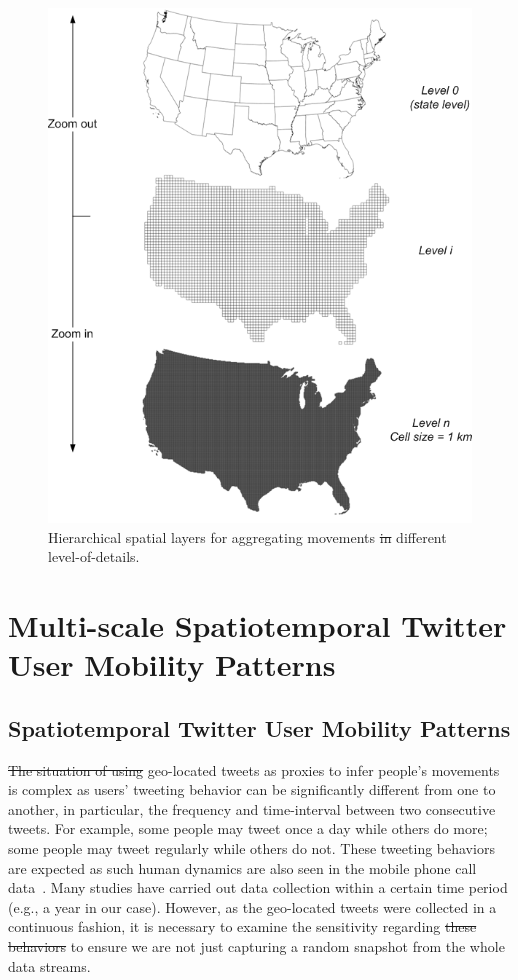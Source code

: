 \documentclass[ijgi,article,accept,moreauthors,pdftex,10pt,a4paper]{mdpi}
\theoremstyle{mdpi}
\newcounter{ex}
\newcounter{re}
\theoremstyle{mdpidefinition}
\providecommand{\DIFadd}[1]{{\protect\color{blue}\uwave{#1}}} %
\providecommand{\DIFdel}[1]{{\protect\color{red}\sout{#1}}}                      %
\providecommand{\DIFaddbegin}{} %
\providecommand{\DIFaddend}{} %
\providecommand{\DIFdelbegin}{} %
\providecommand{\DIFdelend}{} %
\providecommand{\DIFaddFL}[1]{\DIFadd{#1}} %
\providecommand{\DIFdelFL}[1]{\DIFdel{#1}} %
\providecommand{\DIFaddbeginFL}{} %
\providecommand{\DIFaddendFL}{} %
\providecommand{\DIFdelbeginFL}{} %
\providecommand{\DIFdelendFL}{} %
\begin{document}
\begin{figure}[ht]
\centering
\includegraphics[width=0.6\linewidth]{./figures/multilevel}
\caption{Hierarchical spatial layers for aggregating movements \DIFdelbeginFL \DIFdelFL{in }\DIFdelendFL \DIFaddbeginFL \DIFaddFL{with }\DIFaddendFL different level-of-details.}
\label{fig:multilevel}
\end{figure}
\FloatBarrier

\section{Multi-scale Spatiotemporal Twitter User Mobility Patterns}
\subsection{Spatiotemporal Twitter User Mobility Patterns}
\DIFdelbegin \DIFdel{The situation of using }\DIFdelend \DIFaddbegin \DIFadd{Using }\DIFaddend geo-located tweets as proxies to infer people's movements is complex as users' tweeting behavior can be significantly different from one to another, in particular, the frequency and time-interval between two consecutive tweets.
For example, some people may tweet once a day while others do more; some people may tweet regularly while others do not.  
These tweeting behaviors are expected as such human dynamics are also seen in the mobile phone call data~\cite{gonzalez2008understanding}. 
Many studies have carried out data collection within a certain time period (e.g., a year in our case).
However, as the geo-located tweets were collected in a continuous fashion, it is necessary to examine the sensitivity regarding \DIFdelbegin \DIFdel{these behaviors }\DIFdelend \DIFaddbegin \DIFadd{such behavior }\DIFaddend to ensure we are not just capturing a random snapshot from the whole data streams. 
\end{document}
